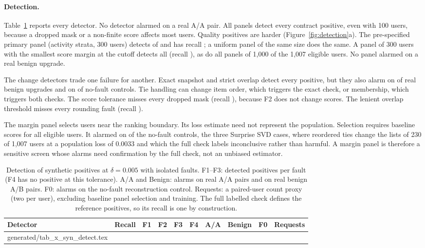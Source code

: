 \documentclass[11pt,a4paper]{article}
\makeatletter
\newcommand{\tablebody}[1]{\@@input generated/#1.tex }
\makeatother
\begin{document}
\paragraph{Detection.} Table~\ref{tab:rq3} reports every detector. No detector
alarmed on a real A/A pair. All panels detect every contract positive, even
with 100 users, because a dropped mask or a non-finite score affects most
users. Quality positives are harder (Figure~\ref{fig:detection}a). The
pre-specified primary panel (activity strata, 300 users) detects
\synPrimaryFOne{} of \synFOne{} and has recall \synRecallPrimary{}; a uniform
panel of the same size does the same. A panel of 300 users with the smallest
score margin at the cutoff detects all \synFOne{} (recall
\synRecallMargin{}), as do all panels of 1{,}000 of the 1{,}007 eligible users.
No panel alarmed on a
real benign upgrade.

The change detectors trade one failure for another. Exact snapshot and strict
overlap detect every positive, but they also alarm on \synSnapshotBenign{} of
\synBenign{} real benign upgrades and on \synControlSnapshotAlarms{} of
\synBase{} no-fault controls. Tie handling can change item order, which
triggers the exact check, or membership, which triggers both checks. The score
tolerance misses every dropped mask (recall \synRecallScoreTol{}), because F2
does not change scores. The lenient overlap threshold misses every rounding
fault (recall \synRecallLenient{}).

The margin panel selects users near the ranking boundary. Its loss estimate
need not represent the population. Selection requires baseline scores for
all eligible users.
It alarmed on \synControlPanelAlarms{} of the \synBase{} no-fault
controls, the three Surprise SVD cases, where reordered ties change the lists
of 230 of 1{,}007 users at a population loss of 0.0033 and which the full
check labels inconclusive rather than harmful. A margin panel is therefore a sensitive
screen whose alarms need confirmation by the full check, not an unbiased
estimator.

\begin{table}[htbp]
  \centering
  \caption{Detection of synthetic positives at $\delta=0.005$ with isolated
    faults. F1--F3: detected positives per fault (F4 has no positive at this
    tolerance). A/A and Benign: alarms on real A/A pairs and on real benign
    A/B pairs. F0: alarms on the no-fault reconstruction control. Requests: a
    paired-user count proxy (two per user), excluding baseline panel selection
    and training. The full labelled check defines the reference positives,
    so its recall is one by construction.}
  \label{tab:rq3}
  \footnotesize\setlength{\tabcolsep}{3pt}
  \begin{tabular}{@{}lrrrrrrrrr@{}}
    \toprule
    Detector & Recall & F1 & F2 & F3 & F4 & A/A & Benign & F0 & Requests \\
    \midrule
    \tablebody{tab_x_syn_detect}
    \bottomrule
  \end{tabular}
\end{table}
\end{document}
